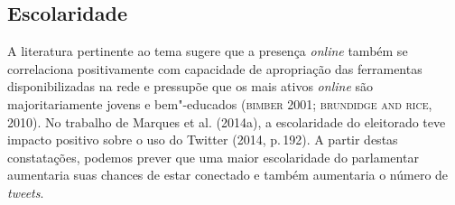
\subsection{Escolaridade}

A literatura pertinente ao tema sugere que a presença \emph{online} também se
correlaciona positivamente com capacidade de apropriação das ferramentas
disponibilizadas na rede e pressupõe que os mais ativos \emph{online} são
majoritariamente jovens e bem"-educados (\textsc{bimber} 2001; \textsc{brundidge and rice},
2010). No trabalho de Marques et al. (2014a), a escolaridade do
eleitorado teve impacto positivo sobre o uso do Twitter (2014, p.\,192). A
partir destas constatações, podemos prever que uma maior escolaridade do
parlamentar aumentaria suas chances de estar conectado e também
aumentaria o número de \emph{tweets}.

